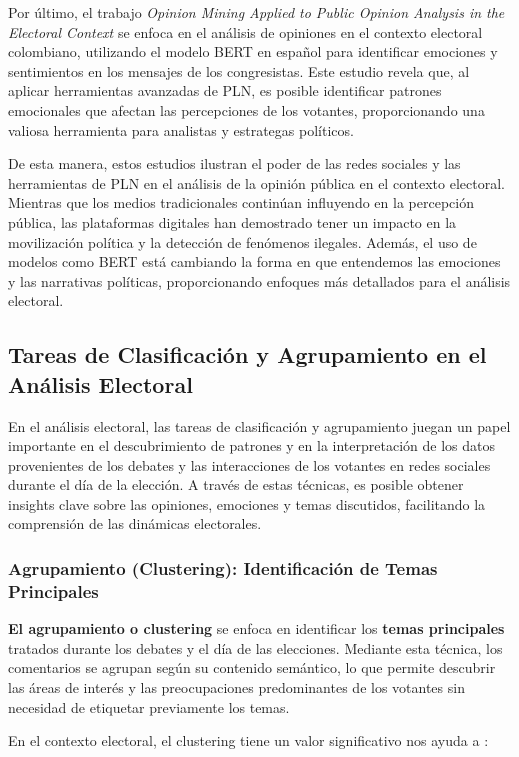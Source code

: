\documentclass[10pt, a4paper]{article}
\begin{document}
	Por último, el trabajo \textit{Opinion Mining Applied to Public Opinion Analysis in the Electoral Context} \parencite{Castiblanco2022} se enfoca en el análisis de opiniones en el contexto electoral colombiano, utilizando el modelo BERT en español para identificar emociones y sentimientos en los mensajes de los congresistas. Este estudio revela que, al aplicar herramientas avanzadas de PLN, es posible identificar patrones emocionales que afectan las percepciones de los votantes, proporcionando una valiosa herramienta para analistas y estrategas políticos. 
	
	De esta manera, estos estudios ilustran el poder de las redes sociales y las herramientas de PLN en el análisis de la opinión pública en el contexto electoral. Mientras que los medios tradicionales continúan influyendo en la percepción pública, las plataformas digitales han demostrado tener un impacto en la movilización política y la detección de fenómenos ilegales. Además, el uso de modelos como BERT está cambiando la forma en que entendemos las emociones y las narrativas políticas, proporcionando enfoques más detallados para el análisis electoral.
	
	
	\subsection{Tareas de Clasificación y Agrupamiento en el Análisis Electoral}
	En el análisis electoral, las tareas de clasificación y agrupamiento juegan un papel importante en el descubrimiento de patrones y en la interpretación de los datos provenientes de los debates y las interacciones de los votantes en redes sociales durante el día de la elección. A través de estas técnicas, es posible obtener insights clave sobre las opiniones, emociones y temas discutidos, facilitando la comprensión de las dinámicas electorales.
	
	\subsubsection{Agrupamiento (Clustering): Identificación de Temas Principales}
	\textbf{El agrupamiento o clustering} se enfoca en identificar los \textbf{temas principales} tratados durante los debates y el día de las elecciones. Mediante esta técnica, los comentarios se agrupan según su contenido semántico, lo que permite descubrir las áreas de interés y las preocupaciones predominantes de los votantes sin necesidad de etiquetar previamente los temas.
	
	En el contexto electoral, el clustering tiene un valor significativo nos ayuda a :
	
\end{document}
